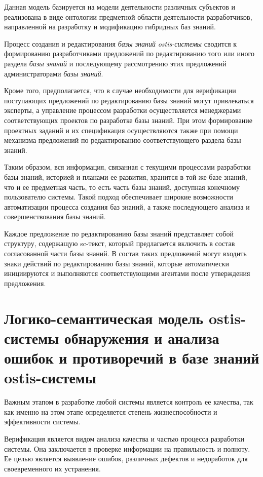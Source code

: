 Данная модель базируется на модели деятельности различных субъектов и реализована в виде онтологии предметной области деятельности разработчиков, направленной на разработку и модификацию гибридных баз знаний.

Процесс создания и редактирования \textit{базы знаний} \textit{ostis-системы} сводится к формированию разработчиками предложений по редактированию того или иного раздела \textit{базы знаний} и последующему рассмотрению этих предложений администраторами \textit{базы знаний}.

Кроме того, предполагается, что в случае необходимости для верификации поступающих предложений по редактированию базы знаний могут привлекаться эксперты, а управление процессом разработки осуществляется менеджерами соответствующих проектов по разработке базы знаний.
При этом формирование проектных заданий и их спецификация осуществляются также при помощи механизма предложений по редактированию соответствующего раздела базы знаний.

Таким образом, вся информация, связанная с текущими процессами разработки базы знаний, историей и планами ее развития, хранится в той же базе знаний, что и ее предметная часть, то есть часть базы знаний, доступная конечному пользователю системы. Такой подход обеспечивает широкие возможности автоматизации процесса создания баз знаний, а также последующего анализа и совершенствования базы знаний.

Каждое предложение по редактированию базы знаний представляет собой структуру, содержащую sc-текст, который предлагается включить в состав согласованной части базы знаний. В состав таких предложений могут входить знаки действий по редактированию базы знаний, которые автоматически инициируются и выполняются соответствующими агентами после утверждения предложения.

\section{Логико-семантическая модель ostis-системы обнаружения и анализа ошибок и противоречий в базе знаний ostis-системы}
\label{sec_kb_design_contradiction}

Важным этапом в разработке любой системы является контроль ее качества, так как именно на этом этапе определяется степень жизнеспособности и эффективности системы.

Верификация является видом анализа качества и частью процесса разработки системы. Она заключается в проверке информации на правильность и полноту.
Ее целью является выявление ошибок, различных дефектов и недоработок для своевременного их устранения.

